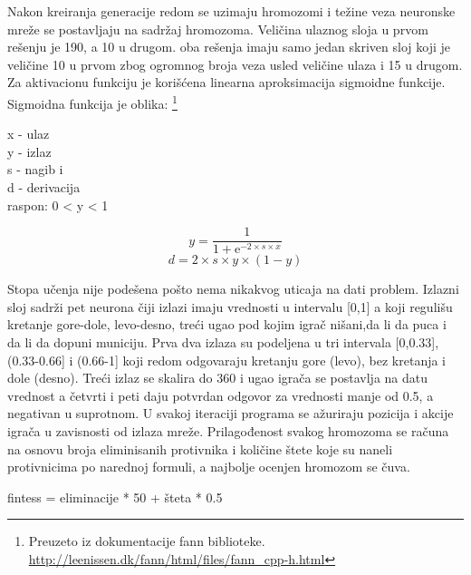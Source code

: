 \documentclass[a4paper]{article}
\begin{document}
\par Nakon kreiranja generacije redom se uzimaju hromozomi i težine veza neuronske mreže se postavljaju na sadržaj hromozoma. Veličina ulaznog sloja u prvom rešenju je 190, a 10 u drugom. oba rešenja imaju samo jedan skriven sloj koji je veličine 10 u prvom zbog ogromnog broja veza usled veličine ulaza i 15 u drugom. Za aktivacionu funkciju je korišćena linearna aproksimacija sigmoidne funkcije. Sigmoidna funkcija je oblika: \footnote{Preuzeto iz dokumentacije fann biblioteke. \url{http://leenissen.dk/fann/html/files/fann_cpp-h.html}}
\begin{tcolorbox}
\begin{center}
x - ulaz \\
y - izlaz \\ 
s - nagib i \\
d - derivacija \\
raspon: 0 < y < 1 \\
\end{center}
\begin{equation}
y = \frac{1}{1 + \mathrm{e}^{-2 \times s \times x}}
\end{equation}
\begin{equation}
d = 2 \times s \times y \times (1 - y)
\end{equation}
\end{tcolorbox}
\noindent  Stopa učenja nije podešena pošto nema nikakvog uticaja na dati problem. Izlazni sloj sadrži pet neurona čiji izlazi imaju vrednosti u intervalu [0,1] a koji regulišu kretanje gore-dole, levo-desno, treći ugao pod kojim igrač nišani,da li da puca i da li da dopuni municiju. Prva dva izlaza su podeljena u tri intervala [0,0.33], (0.33-0.66] i (0.66-1] koji redom odgovaraju kretanju gore (levo), bez kretanja i dole (desno). Treći izlaz se skalira do 360 i ugao igrača se postavlja na datu vrednost a četvrti i peti daju potvrdan odgovor za vrednosti manje od 0.5, a negativan u suprotnom. U svakoj iteraciji programa se ažuriraju pozicija i akcije igrača u zavisnosti od izlaza mreže. Prilagođenost svakog hromozoma se računa na osnovu broja eliminisanih protivnika i količine štete koje su naneli protivnicima po narednoj formuli, a najbolje ocenjen hromozom se čuva.
\begin{tcolorbox}
fintess = eliminacije * 50 + šteta * 0.5
\end{tcolorbox}
\end{document}
